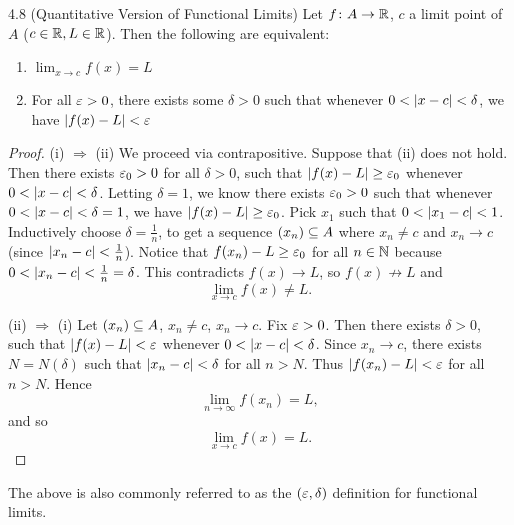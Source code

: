 \documentclass[class=article, crop=false]{standalone}
\begin{document}
  \begin{theorem}{4.8 (Quantitative Version of Functional Limits)}
    Let $f\colon A\to \mathbb{R}$, $c$ a limit point of $A$ ($c\in \mathbb{R}, L\in\mathbb{R}$). Then the following are equivalent:
    \begin{enumerate}[label=(\roman*)]
      \item $\displaystyle \lim_{x\to c} f(x) = L$
      \item For all $\varepsilon > 0$, there exists some $\delta > 0$ such that whenever $0 < \left\lvert x - c \right\rvert < \delta$, we have $\left\lvert f(x) - L \right\rvert < \varepsilon$
    \end{enumerate}
    \begin{proof}
      (i) $\Rightarrow$ (ii) We proceed via contrapositive. Suppose that (ii) does not hold. Then there exists $\varepsilon_0 > 0$ for all $\delta > 0$, such that $\left\lvert f(x) - L \right\rvert\geq \varepsilon_0$ whenever $0 < \left\lvert x - c \right\rvert < \delta$. Letting $\delta = 1$, we know there exists $\varepsilon_0 > 0$ such that whenever $0 < \left\lvert x - c \right\rvert < \delta = 1$, we have $\left\lvert f(x) - L \right\rvert \geq \varepsilon_0$. Pick $x_1$ such that $0 < \left\lvert x_1 - c \right\rvert < 1$. Inductively choose $\delta = \frac{1}{n}$, to get a sequence $(x_n)\subseteq A$ where $x_n\neq c$ and $x_n\to c$ (since $\left\lvert x_n - c \right\rvert < \frac{1}{n}$). Notice that $f(x_n) - L\geq \varepsilon_0$ for all $n\in\mathbb{N}$ because $0 < \left\lvert x_n - c \right\rvert < \frac{1}{n} = \delta$. This contradicts $f(x)\to L$, so $f(x)\not\to L$ and
      \[
        \lim_{x\to c} f(x) \neq L.
      \]
      \par
      (ii) $\Rightarrow$ (i) Let $(x_n)\subseteq A$, $x_n\neq c$, $x_n\to c$. Fix $\varepsilon > 0$. Then there exists $\delta > 0$, such that $\left\lvert f(x) - L \right\rvert < \varepsilon$ whenever $0 < \left\lvert x - c \right\rvert < \delta$. Since $x_n\to c$, there exists $N = N(\delta)$ such that $\left\lvert x_n - c \right\rvert < \delta$ for all $n > N$. Thus $\left\lvert f(x_n) - L \right\rvert < \varepsilon$ for all $n > N$. Hence
      \[
        \lim_{n\to \infty} f(x_n) = L,
      \]
      and so
      \[
        \lim_{x\to c} f(x) = L.
      \]
    \end{proof}
  \end{theorem}
  \begin{note}{}
    The above is also commonly referred to as the $(\varepsilon, \delta)$ definition for functional limits.
  \end{note}
\end{document}
